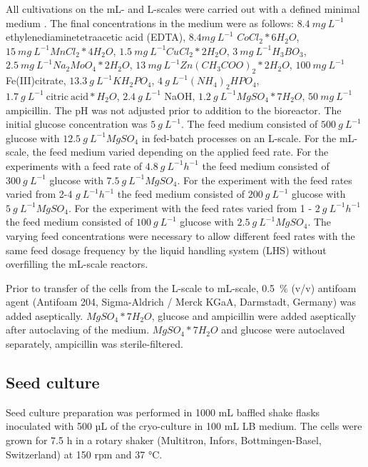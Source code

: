 \documentclass[sn-standardnature]{sn-jnl}%
\theoremstyle{thmstyleone}%
\theoremstyle{thmstyletwo}%
\theoremstyle{thmstylethree}%
\begin{document}
All cultivations on the mL- and L-scales were carried out with a defined minimal medium \cite{riesenberg1991high}.
The final concentrations in the medium were as follows:
$8.4\ mg\ L^{-1}$ ethylenediaminetetraacetic acid (EDTA), $8.4 mg\ L^{-1}$ $CoCl_{2}*6H_{2}O$, $15\ mg\ L^{-1} MnCl_{2}*4H_{2}O$, $1.5\ mg\ L^{-1} CuCl_{2}*2H_{2}O$, $3\ mg\ L^{-1} H_{3}BO_{3}$, $2.5\ mg\ L^{-1} Na_{2}MoO_{4}*2H_{2}O$, $13\ mg\ L^{-1} Zn(CH_{3}COO)_{2}*2H_{2}O$, $100\ mg\ L^{-1}$ Fe(III)citrate, $13.3\ g\ L^{-1} KH_{2}PO_{4}$, $4\ g\ L^{-1} (NH_{4})_{2}HPO_{4}$, $1.7\ g\ L^{-1}\ \mathrm{citric\ acid}*H_{2}O$, $2.4\ g\ L^{-1}$ NaOH, $1.2\ g\ L^{-1} MgSO_{4}*7H_{2}O$, $50\ mg\ L^{-1}$ ampicillin.
The pH was not adjusted prior to addition to the bioreactor.
The initial glucose concentration was $5\ g\ L^{-1}$.
The feed medium consisted of $500\ g\ L^{-1}$ glucose with $12.5\ g\ L^{-1} MgSO_{4}$ in fed-batch processes on an L-scale.
For the mL-scale, the feed medium varied depending on the applied feed rate.
For the experiments with a feed rate of $4.8\ g\ L^{-1} h^{-1}$ the feed medium consisted of $300\ g\ L^{-1}$ glucose with $7.5\ g\ L^{-1} MgSO_{4}$.
For the experiment with the feed rates varied from 2-4 $g\ L^{-1}h^{-1}$ the feed medium consisted of $200\ g\ L^{-1}$ glucose with $5\ g\ L^{-1} MgSO_{4}$.
For the experiment with the feed rates varied from 1 - $2\ g\ L^{-1} h^{-1}$ the feed medium consisted of $100\ g\ L ^{-1}$ glucose with $2.5\ g\ L^{-1} MgSO_{4}$.
The varying feed concentrations were necessary to allow different feed rates with the same feed dosage frequency by the liquid handling system (LHS) without overfilling the mL-scale reactors.

Prior to transfer of the cells from the L-scale to mL-scale, 0.5~\% (v/v) antifoam agent (Antifoam 204, Sigma-Aldrich / Merck KGaA, Darmstadt, Germany) was added aseptically.
$MgSO_{4}*7H_{2}O$, glucose and ampicillin were added aseptically after autoclaving of the medium.
$MgSO_{4}*7H_{2}O$ and glucose were autoclaved separately, ampicillin was sterile-filtered.

\subsection{Seed culture}
Seed culture preparation was performed in 1000 mL baffled shake flasks inoculated with 500 µL of the cryo-culture in 100 mL LB medium.
The cells were grown for 7.5 h in a rotary shaker (Multitron, Infors, Bottmingen-Basel, Switzerland) at 150 rpm and 37 °C.
\end{document}
